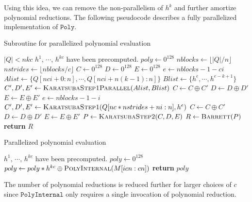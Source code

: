 \documentclass[hctr.tex]{subfiles}
\begin{document}
Using this idea, we can remove the non-parallelism of $h^k$ and further amortize polynomial reductions. The following pseudocode describes a fully parallelized implementation of $\texttt{Poly}$.
\begin{algorithm}[H]
\caption{Subroutine for parallelized polynomial evaluation}\label{polyalgsub}
\begin{algorithmic}[1]
	\Require $|Q| < nkc$
	\Require $h^1$, $\cdots$, $h^{kc}$ have been precomputed.
		\State $poly \gets 0^{128}$
		\State $nblocks \gets \lfloor |Q|/n \rfloor$
		\State $nstrides \gets \lfloor nblocks/c \rfloor$
		\State $C \gets 0^{128}$
		\State $D \gets 0^{128}$
		\State $E \gets 0^{128}$
			\State $e \gets nblocks - 1 - ci$
			\State $Alist \gets \{Q[nci + 0 : n], \cdots, Q[nci + n(k - 1) : n]\}$
			\State $Blist \gets \{h^{e}, \cdots, h^{e - k + 1}\}$
			\State $C', D', E' \gets \Call{KaratsubaStep1Parallel}{Alist, Blist}$
			\State $C \gets C \oplus C'$
			\State $D \gets D \oplus D'$
			\State $E \gets E \oplus E'$
		\EndFor
			\State $e \gets nblocks - 1 - i$
			\State $C', D', E' \gets \Call{KaratsubaStep1}{Q[nc*nstrides + ni : n], h^{e}}$
			\State $C \gets C \oplus C'$
			\State $D \gets D \oplus D'$
			\State $E \gets E \oplus E'$
		\EndFor
		\State $P \gets \Call{KaratsubaStep2}{C, D, E}$
		\State $R \gets \Call{Barrett}{P}$
		\State \textbf{return} $R$
	\EndProcedure
\end{algorithmic}
\end{algorithm}

\begin{algorithm}[H]
\caption{Parallelized polynomial evaluation}\label{polyalg}
\begin{algorithmic}[1]
	\Require $h^1$, $\cdots$, $h^{kc}$ have been precomputed.
		\State $poly \gets 0^{128}$
			\State $poly \gets poly*h^{kc} \oplus \Call{PolyInternal}{M[icn : cn]}$
		\EndFor
		\State \textbf{return} $poly$
	\EndProcedure
\end{algorithmic}
\end{algorithm}
The number of polynomial reductions is reduced further for larger choices of $c$ since $\texttt{PolyInternal}$ only requires a single invocation of polynomial reduction.
\end{document}
